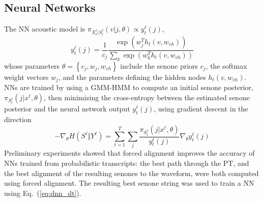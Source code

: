 \subsection{Neural Networks}

The NN acoustic model is $\pi_{X_t^{\ell}|S_t^\ell}(v|j,\theta)\propto y_t^\ell(j)$,
\begin{equation}
y_t^\ell(j)=\frac{1}{c_j}\frac{\exp\left(w_j^Th_t(v,w_{vh})\right)}
{\sum_k \exp\left(w_k^Th_t(v,w_{vh})\right)}
\end{equation}
whose parameters $\theta=\left\{c_j,w_j,w_{vh}\right\}$ include the
senone priors $c_j$, the softmax weight vectors $w_j$, and the
parameters defining the hidden nodes $h_t(v,w_{vh})$.  NNs are
trained by using a GMM-HMM to compute an initial senone posterior,
$\pi_{S_t^{\ell}}(j|x^\ell,\theta)$, then minimizing the cross-entropy
between the estimated senone posterior and the neural network output
$y_{t}^\ell(j)$,
using gradient descent in the direction
\begin{equation}
  -\nabla_\theta H(S^\ell\Vert Y^\ell)=
  \sum_{t=1}^T\sum_j\frac{\pi_{S_t^{\ell}}(j|x^\ell,\theta)}{y_t^\ell(j)}
  \nabla_\theta y_t^\ell(j)
  \label{eq:dnn_dt}
\end{equation}
Preliminary experiments showed that forced alignment improves the
accuracy of NNs trained from probabilistic transcripts: the best path
through the PT, and the best alignment of the resulting senones to the
waveform, were both computed using forced alignment.  The resulting
best senone string was used to train a NN using Eq.~(\ref{eq:dnn_dt}).

